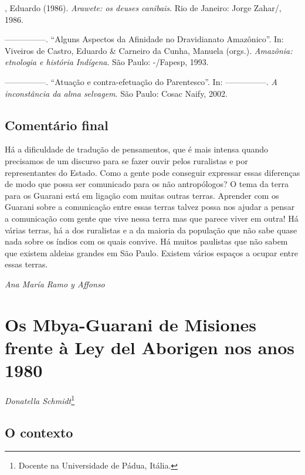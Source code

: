{{\begin{Parskip}
  , Eduardo (1986). \emph{Arawete: os deuses canibais}. Rio de
Janeiro: Jorge Zahar/, 1986.

—————. ``Alguns Aspectos da Afinidade no Dravidianato Amazônico''. In:
Viveiros de Castro, Eduardo \& Carneiro da Cunha, Manuela (orgs.).
\emph{Amazônia: etnologia e história Indígena}. São Paulo: -/Fapesp,
1993.

—————. ``Atuação e contra-efetuação do Parentesco''. In: —————. \emph{A inconstância da
alma selvagem}. São Paulo: Cosac Naify, 2002.
\end{Parskip}

\section{Comentário final}
Há a dificuldade de tradução de pensamentos, que é mais intensa quando
precisamos de um discurso para se fazer ouvir pelos ruralistas e por
representantes do Estado. Como a gente pode conseguir expressar essas
diferenças de modo que possa ser comunicado para os não antropólogos? O
tema da terra para os Guarani está em ligação com muitas outras terras.
Aprender com os Guarani sobre a comunicação entre essas terras talvez
possa nos ajudar a pensar a comunicação com gente que vive nessa terra
mas que parece viver em outra! Há várias terras, há a dos ruralistas e
a da maioria da população que não sabe quase nada sobre os índios com
os quais convive. Há muitos paulistas que não sabem que existem aldeias
grandes em São Paulo. Existem vários espaços a ocupar entre essas
terras. 
\medskip
\begin{flushright}
\emph{Ana María Ramo y Affonso}
\end{flushright}

\chapter{Os Mbya-Guarani de Misiones frente à Ley del Aborigen nos anos 1980}
\begin{flushright}
\emph{Donatella Schmidt}\footnote{Docente na Universidade de Pádua, Itália.}
\end{flushright}
\medskip

\section{O contexto}

}}
